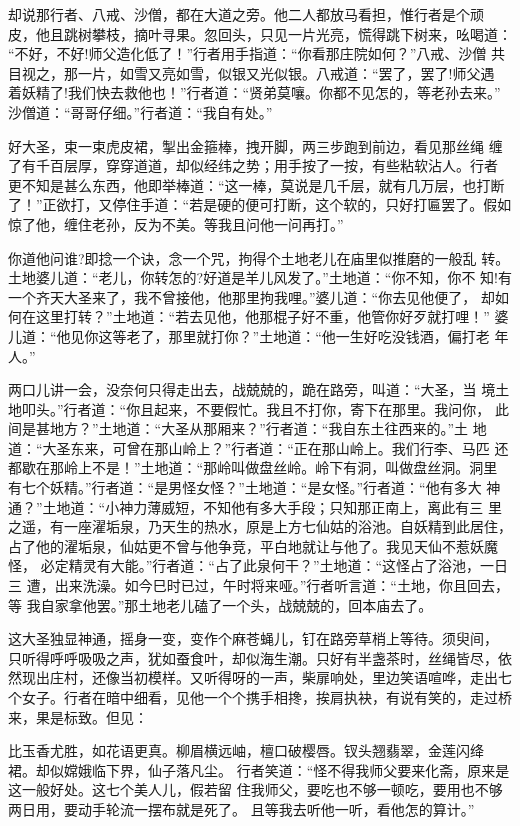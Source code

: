 却说那行者、八戒、沙僧，都在大道之旁。他二人都放马看担，惟行者是个顽
皮，他且跳树攀枝，摘叶寻果。忽回头，只见一片光亮，慌得跳下树来，吆喝道：
“不好，不好!师父造化低了！”行者用手指道：“你看那庄院如何？”八戒、沙僧
共目视之，那一片，如雪又亮如雪，似银又光似银。八戒道：“罢了，罢了!师父遇
着妖精了!我们快去救他也！”行者道：“贤弟莫嚷。你都不见怎的，等老孙去来。”
沙僧道：“哥哥仔细。”行者道：“我自有处。”

好大圣，束一束虎皮裙，掣出金箍棒，拽开脚，两三步跑到前边，看见那丝绳
缠了有千百层厚，穿穿道道，却似经纬之势；用手按了一按，有些粘软沾人。行者
更不知是甚么东西，他即举棒道：“这一棒，莫说是几千层，就有几万层，也打断
了！”正欲打，又停住手道：“若是硬的便可打断，这个软的，只好打匾罢了。假如
惊了他，缠住老孙，反为不美。等我且问他一问再打。”

你道他问谁?即捻一个诀，念一个咒，拘得个土地老儿在庙里似推磨的一般乱
转。土地婆儿道：“老儿，你转怎的?好道是羊儿风发了。”土地道：“你不知，你不
知!有一个齐天大圣来了，我不曾接他，他那里拘我哩。”婆儿道：“你去见他便了，
却如何在这里打转？”土地道：“若去见他，他那棍子好不重，他管你好歹就打哩！”
婆儿道：“他见你这等老了，那里就打你？”土地道：“他一生好吃没钱酒，偏打老
年人。”

两口儿讲一会，没奈何只得走出去，战兢兢的，跪在路旁，叫道：“大圣，当
境土地叩头。”行者道：“你且起来，不要假忙。我且不打你，寄下在那里。我问你，
此间是甚地方？”土地道：“大圣从那厢来？”行者道：“我自东土往西来的。”土
地道：“大圣东来，可曾在那山岭上？”行者道：“正在那山岭上。我们行李、马匹
还都歇在那岭上不是！”土地道：“那岭叫做盘丝岭。岭下有洞，叫做盘丝洞。洞里
有七个妖精。”行者道：“是男怪女怪？”土地道：“是女怪。”行者道：“他有多大
神通？”土地道：“小神力薄威短，不知他有多大手段；只知那正南上，离此有三
里之遥，有一座濯垢泉，乃天生的热水，原是上方七仙姑的浴池。自妖精到此居住，
占了他的濯垢泉，仙姑更不曾与他争竞，平白地就让与他了。我见天仙不惹妖魔怪，
必定精灵有大能。”行者道：“占了此泉何干？”土地道：“这怪占了浴池，一日三
遭，出来洗澡。如今巳时已过，午时将来哑。”行者听言道：“土地，你且回去，等
我自家拿他罢。”那土地老儿磕了一个头，战兢兢的，回本庙去了。

这大圣独显神通，摇身一变，变作个麻苍蝇儿，钉在路旁草梢上等待。须臾间，
只听得呼呼吸吸之声，犹如蚕食叶，却似海生潮。只好有半盏茶时，丝绳皆尽，依
然现出庄村，还像当初模样。又听得呀的一声，柴扉响处，里边笑语喧哗，走出七
个女子。行者在暗中细看，见他一个个携手相搀，挨肩执袂，有说有笑的，走过桥
来，果是标致。但见：

比玉香尤胜，如花语更真。柳眉横远岫，檀口破樱唇。钗头翘翡翠，金莲闪绛
裙。却似嫦娥临下界，仙子落凡尘。
行者笑道：“怪不得我师父要来化斋，原来是这一般好处。这七个美人儿，假若留
住我师父，要吃也不够一顿吃，要用也不够两日用，要动手轮流一摆布就是死了。
且等我去听他一听，看他怎的算计。”

